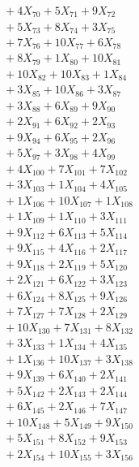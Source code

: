 \documentclass[a4paper,10pt]{article}
\begin{document}
{\begin{align}
&\;  + 4 X_{70} + 5 X_{71} + 9 X_{72} \\[0.3ex]
&\;  + 5 X_{73} + 8 X_{74} + 3 X_{75} \\[0.3ex]
&\;  + 7 X_{76} + 10 X_{77} + 6 X_{78} \\[0.3ex]
&\;  + 8 X_{79} + 1 X_{80} + 10 X_{81} \\[0.3ex]
&\;  + 10 X_{82} + 10 X_{83} + 1 X_{84} \\[0.3ex]
&\;  + 3 X_{85} + 10 X_{86} + 3 X_{87} \\[0.3ex]
&\;  + 3 X_{88} + 6 X_{89} + 9 X_{90} \\[0.3ex]
&\;  + 2 X_{91} + 6 X_{92} + 2 X_{93} \\[0.3ex]
&\;  + 9 X_{94} + 6 X_{95} + 2 X_{96} \\[0.3ex]
&\;  + 5 X_{97} + 3 X_{98} + 4 X_{99} \\[0.5ex]\allowbreak
&\;  + 4 X_{100} + 7 X_{101} + 7 X_{102} \\[0.3ex]
&\;  + 3 X_{103} + 1 X_{104} + 4 X_{105} \\[0.3ex]
&\;  + 1 X_{106} + 10 X_{107} + 1 X_{108} \\[0.3ex]
&\;  + 1 X_{109} + 1 X_{110} + 3 X_{111} \\[0.3ex]
&\;  + 9 X_{112} + 6 X_{113} + 5 X_{114} \\[0.3ex]
&\;  + 9 X_{115} + 4 X_{116} + 2 X_{117} \\[0.3ex]
&\;  + 9 X_{118} + 2 X_{119} + 5 X_{120} \\[0.3ex]
&\;  + 2 X_{121} + 6 X_{122} + 3 X_{123} \\[0.3ex]
&\;  + 6 X_{124} + 8 X_{125} + 9 X_{126} \\[0.3ex]
&\;  + 7 X_{127} + 7 X_{128} + 2 X_{129} \\[0.5ex]\allowbreak
&\;  + 10 X_{130} + 7 X_{131} + 8 X_{132} \\[0.3ex]
&\;  + 3 X_{133} + 1 X_{134} + 4 X_{135} \\[0.3ex]
&\;  + 1 X_{136} + 10 X_{137} + 3 X_{138} \\[0.3ex]
&\;  + 9 X_{139} + 6 X_{140} + 2 X_{141} \\[0.3ex]
&\;  + 5 X_{142} + 2 X_{143} + 2 X_{144} \\[0.3ex]
&\;  + 6 X_{145} + 2 X_{146} + 7 X_{147} \\[0.3ex]
&\;  + 10 X_{148} + 5 X_{149} + 9 X_{150} \\[0.3ex]
&\;  + 5 X_{151} + 8 X_{152} + 9 X_{153} \\[0.3ex]
&\;  + 2 X_{154} + 10 X_{155} + 3 X_{156} \\[0.3ex]

\end{align}}
\end{document}
